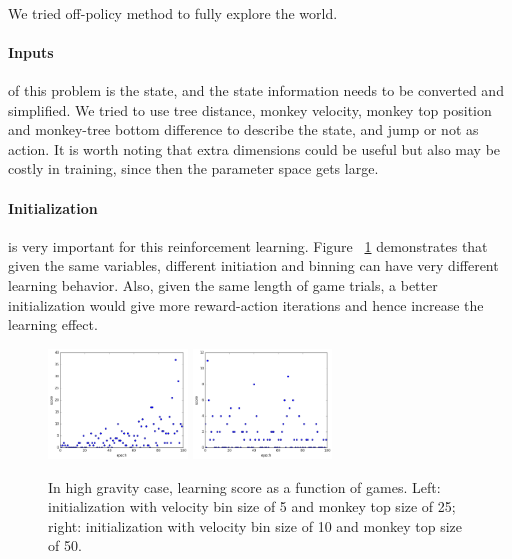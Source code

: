 \documentclass[11pt]{article}
\begin{document}
\paragraph{}
We tried off-policy method to fully explore the world.
 
\paragraph{Inputs} of this problem is the state, and the state information needs to be converted and simplified. We tried to use tree distance, monkey velocity, monkey top position and monkey-tree bottom difference to describe the state, and jump or not as action. It is worth noting that extra dimensions could be useful but also may be costly in training, since then the parameter space gets large. 

\paragraph{Initialization} is very important for this reinforcement learning. Figure ~\ref{QInitial} demonstrates that given the same variables, different initiation and binning can have very different learning behavior. Also, given the same length of game trials, a better initialization would give more reward-action iterations and hence increase the learning effect.
\begin{figure}[] 
\centering
        \includegraphics[width=0.33\textwidth]{Plot/learn_vel5_mtop25.png}
        \includegraphics[width=0.33\textwidth]{Plot/learn_vel10_mtop50.png}
        \caption{In high gravity case, learning score as a function of games. Left: initialization with velocity bin size of 5 and monkey top size of 25; right: initialization with velocity bin size of 10 and monkey top size of 50.}
            \label{QInitial}
\end{figure}
\end{document}

